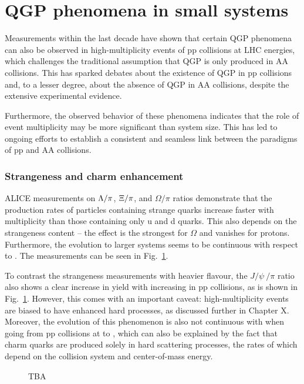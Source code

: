 \section{QGP phenomena in small systems}

Measurements within the last decade have shown that certain QGP phenomena can also be observed in high-multiplicity events of pp collisions at LHC energies, which challenges the traditional assumption that QGP is only produced in AA collisions. This has sparked debates about the existence of QGP in pp collisions and, to a lesser degree, about the absence of QGP in AA collisions, despite the extensive experimental evidence.

Furthermore, the observed behavior of these phenomena indicates that the role of event multiplicity \Nch may be more significant than system size. This has led to ongoing efforts to establish a consistent and seamless link between the paradigms of pp and AA collisions.

\subsubsection{Strangeness and charm enhancement}

ALICE measurements on $\Lambda/\pi$, $\Xi/\pi$, and $\Omega/\pi$ ratios demonstrate that the production rates of particles containing strange quarks increase faster with multiplicity than those containing only u and d quarks. This also depends on the strangeness content -- the effect is the strongest for $\Omega$ and vanishes for protons. Furthermore, the evolution to larger systems seems to be continuous with respect to \Nch. The measurements can be seen in Fig.~\ref{fig:colls:ssstrangeness}.

To contrast the strangeness measurements with heavier flavour, the $J/\psi \ /\pi$ ratio also shows a clear increase in yield with increasing \Nch in pp collisions, as is shown in Fig.~\ref{fig:colls:ssstrangeness}. However, this comes with an important caveat: high-multiplicity events are biased to have enhanced hard processes, as discussed further in Chapter X. Moreover, the evolution of this phenomenon is also not continuous with \Nch when going from pp collisions at  to , which can also be explained by the fact that charm quarks are produced solely in hard scattering processes, the rates of which depend on the collision system and center-of-mass energy.

\begin{figure}[H]
\hspace{2em}
\caption{TBA}
\label{fig:colls:ssstrangeness}
\end{figure}

